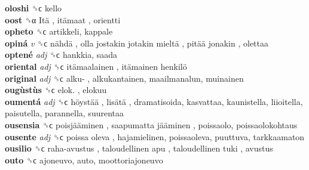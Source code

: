 \textbf{oloshi} ␝ϲ  kello  \\
\textbf{oost} ␝α   Itä ,  itämaat , orientti  \\
\textbf{opheto} ␝ϲ  artikkeli, kappale  \\
\textbf{opiná} \emph{v}  ␝ϲ   nähdä ,  olla jostakin jotakin mieltä ,  pitää jonakin , olettaa  \\
\textbf{optené} \emph{adj}  ␝ϲ  hankkia, saada  \\
\textbf{oriental} \emph{adj}  ␝ϲ   itämaalainen ,  itämainen henkilö   \\
\textbf{original} \emph{adj}  ␝ϲ   alku- , alkukantainen, maailmanalun, muinainen  \\
\textbf{ougùstùs} ␝ϲ   elok. , elokuu  \\
\textbf{oumentá} \emph{adj}  ␝ϲ   höystää ,  lisätä , dramatisoida, kasvattaa, kaunistella, liioitella, paisutella, parannella, suurentaa  \\
\textbf{ousensia} ␝ϲ   poisjääminen ,  saapumatta jääminen , poissaolo, poissaolokohtaus  \\
\textbf{ousente} \emph{adj}  ␝ϲ   poissa oleva , hajamielinen, poissaoleva, puuttuva, tarkkaamaton  \\
\textbf{ousilio} ␝ϲ   raha-avustus ,  taloudellinen apu ,  taloudellinen tuki , avustus  \\
\textbf{outo} ␝ϲ  ajoneuvo, auto, moottoriajoneuvo  \\
